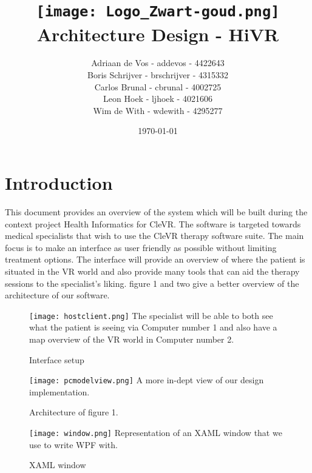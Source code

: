 \documentclass[11pt]{article}
\begin{document}
\title{	
		\vspace{-3.5cm}
		\texttt{[image: Logo\_Zwart-goud.png]} 
		\newline Architecture Design - HiVR
}

\author{
	Adriaan de Vos - addevos - 4422643\\
	Boris Schrijver - brschrijver - 4315332\\
	Carlos Brunal - cbrunal - 4002725\\
	Leon Hoek - ljhoek - 4021606\\
	Wim de With - wdewith - 4295277
}

\date{\today}
\maketitle
\newpage
\tableofcontents
\newpage

\section{Introduction}
This document provides an overview of the system which will be built during the context project Health Informatics for \gls{CleVR}.
\newline
The software is targeted towards medical specialists that wish to use the CleVR therapy software suite. The main focus is to make an interface as user friendly as possible without limiting treatment options. The interface will provide an overview of where the patient is situated in the VR world and also provide many tools that can aid the therapy sessions to the specialist's liking. figure 1 and two give a better overview of the architecture of our software.

\begin{figure}[H]
	\caption{Interface setup}
	\texttt{[image: hostclient.png]}
    The specialist will be able to both see what the patient is seeing via Computer number 1 and also have a map overview of the VR world in Computer number 2.
\end{figure}

\begin{figure}[H]
	\caption{Architecture of figure 1.}
	\texttt{[image: pcmodelview.png]}
    A more in-dept view of our design implementation.
\end{figure}

\begin{figure}[H]
	\caption{XAML window}
	\texttt{[image: window.png]}
    Representation of an XAML window that we use to write WPF with.
\end{figure}
\end{document}
